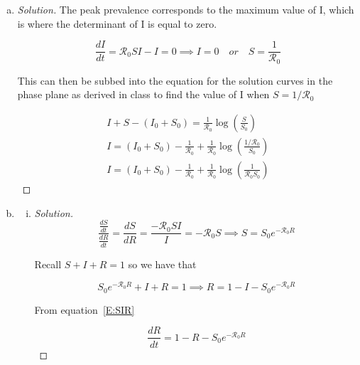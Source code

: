 \documentclass[12pt]{article}
\begin{document}
\basicSIRanalIntro
\begin{enumerate}[(a)]
\item \basicSIRanalQa

{\color{blue}
\begin{proof}[Solution]
	The peak prevalence corresponds to the maximum value of I, which is where the determinant of I is equal to zero. 
	
	\begin{equation}
	\frac{dI}{dt}=\mathcal{R}_0 SI-I=0 \implies I=0 \quad or \quad  S=\frac{1}{\mathcal{R}_0}
	\end{equation}
	
	This can then be subbed into the equation for the solution curves in the phase plane as derived in class to find the value of I when $S=1/\mathcal{R}_0$
	
	\begin{gather}
	I+S-(I_0+S_0)=\frac{1}{\mathcal{R}_0}\log\left(\frac{S}{S_0}\right) \\
	I=(I_0+S_0)-\frac{1}{\mathcal{R}_0}+\frac{1}{\mathcal{R}_0}\log\left(\frac{1/\mathcal{R}_0}{S_0}\right) \\
	I=(I_0+S_0)-\frac{1}{\mathcal{R}_0}+\frac{1}{\mathcal{R}_0}\log\left(\frac{1}{\mathcal{R}_0S_0}\right)
	\end{gather}
\end{proof}
}

\item \basicSIRanalQb
  \begin{enumerate}[(i)]
  \item \basicSIRanalQbi

{\color{blue}
\begin{proof}[Solution]

	\begin{equation}
	\frac{\frac{dS}{dt}}{\frac{dR}{dt}} = \frac{dS}{dR} = \frac{-\mathcal{R}_0SI}{I} = -\mathcal{R}_0S \implies S=S_0e^{-\mathcal{R}_0R}
	\end{equation}
	
	Recall $S+I+R=1$ so we have that
	
	\begin{equation}
	S_0e^{-\mathcal{R}_0R}+I+R = 1 \implies R=1-I-S_0e^{-\mathcal{R}_0R}
	\end{equation}
	
	From equation~\eqref{E:SIR}
	
	\begin{equation}
	\frac{dR}{dt}=1-R-S_0e^{-\mathcal{R}_0R}
	\end{equation}
	

\end{proof}}
\end{enumerate}
\end{enumerate}
\end{document}
